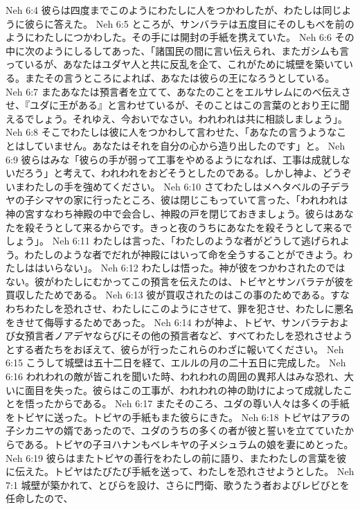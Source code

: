 Neh 6:4  彼らは四度までこのようにわたしに人をつかわしたが、わたしは同じように彼らに答えた。
Neh 6:5  ところが、サンバラテは五度目にそのしもべを前のようにわたしにつかわした。その手には開封の手紙を携えていた。
Neh 6:6  その中に次のようにしるしてあった、「諸国民の間に言い伝えられ、またガシムも言っているが、あなたはユダヤ人と共に反乱を企て、これがために城壁を築いている。またその言うところによれば、あなたは彼らの王になろうとしている。
Neh 6:7  またあなたは預言者を立てて、あなたのことをエルサレムにのべ伝えさせ、『ユダに王がある』と言わせているが、そのことはこの言葉のとおり王に聞えるでしょう。それゆえ、今おいでなさい。われわれは共に相談しましょう」。
Neh 6:8  そこでわたしは彼に人をつかわして言わせた、「あなたの言うようなことはしていません。あなたはそれを自分の心から造り出したのです」と。
Neh 6:9  彼らはみな「彼らの手が弱って工事をやめるようになれば、工事は成就しないだろう」と考えて、われわれをおどそうとしたのである。しかし神よ、どうぞいまわたしの手を強めてください。
Neh 6:10  さてわたしはメヘタベルの子デラヤの子シマヤの家に行ったところ、彼は閉じこもっていて言った、「われわれは神の宮すなわち神殿の中で会合し、神殿の戸を閉じておきましょう。彼らはあなたを殺そうとして来るからです。きっと夜のうちにあなたを殺そうとして来るでしょう」。
Neh 6:11  わたしは言った、「わたしのような者がどうして逃げられよう。わたしのような者でだれが神殿にはいって命を全うすることができよう。わたしははいらない」。
Neh 6:12  わたしは悟った。神が彼をつかわされたのではない。彼がわたしにむかってこの預言を伝えたのは、トビヤとサンバラテが彼を買収したためである。
Neh 6:13  彼が買収されたのはこの事のためである。すなわちわたしを恐れさせ、わたしにこのようにさせて、罪を犯させ、わたしに悪名をきせて侮辱するためであった。
Neh 6:14  わが神よ、トビヤ、サンバラテおよび女預言者ノアデヤならびにその他の預言者など、すべてわたしを恐れさせようとする者たちをおぼえて、彼らが行ったこれらのわざに報いてください。
Neh 6:15  こうして城壁は五十二日を経て、エルルの月の二十五日に完成した。
Neh 6:16  われわれの敵が皆これを聞いた時、われわれの周囲の異邦人はみな恐れ、大いに面目を失った。彼らはこの工事が、われわれの神の助けによって成就したことを悟ったからである。
Neh 6:17  またそのころ、ユダの尊い人々は多くの手紙をトビヤに送った。トビヤの手紙もまた彼らにきた。
Neh 6:18  トビヤはアラの子シカニヤの婿であったので、ユダのうちの多くの者が彼と誓いを立てていたからである。トビヤの子ヨハナンもベレキヤの子メシュラムの娘を妻にめとった。
Neh 6:19  彼らはまたトビヤの善行をわたしの前に語り、またわたしの言葉を彼に伝えた。トビヤはたびたび手紙を送って、わたしを恐れさせようとした。
Neh 7:1  城壁が築かれて、とびらを設け、さらに門衛、歌うたう者およびレビびとを任命したので、
